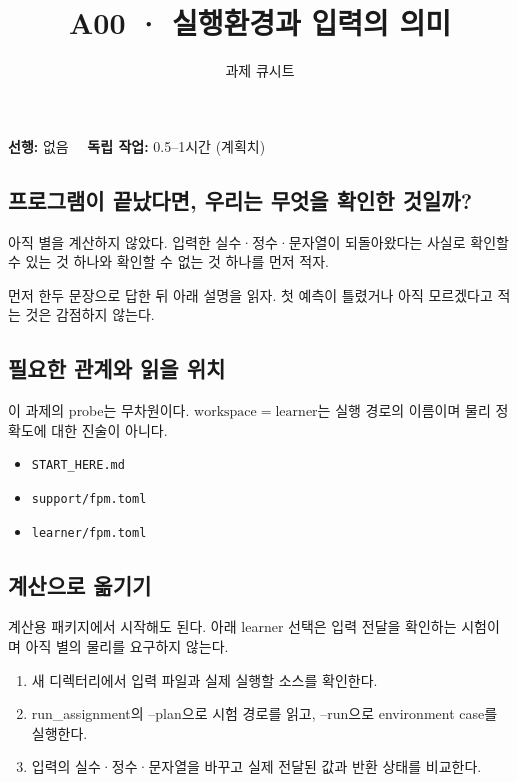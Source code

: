 \documentclass[
  10pt,
  a4paper,
]{article}
\title{A00 · 실행환경과 입력의 의미}
\subtitle{과제 큐시트}
\author{}
\date{}
\providecommand{\tightlist}{%
  \setlength{\itemsep}{0pt}\setlength{\parskip}{0pt}}
\begin{document}
\maketitle

\textbf{선행:} 없음　 \textbf{독립 작업:} 0.5--1시간 (계획치)

\subsection{프로그램이 끝났다면, 우리는 무엇을 확인한
것일까?}\label{uxd504uxb85cuxadf8uxb7a8uxc774-uxb05duxb0acuxb2e4uxba74-uxc6b0uxb9acuxb294-uxbb34uxc5c7uxc744-uxd655uxc778uxd55c-uxac83uxc77cuxae4c}

아직 별을 계산하지 않았다. 입력한 실수·정수·문자열이 되돌아왔다는 사실로
확인할 수 있는 것 하나와 확인할 수 없는 것 하나를 먼저 적자.

먼저 한두 문장으로 답한 뒤 아래 설명을 읽자. 첫 예측이 틀렸거나 아직
모르겠다고 적는 것은 감점하지 않는다.

\subsection{필요한 관계와 읽을
위치}\label{uxd544uxc694uxd55c-uxad00uxacc4uxc640-uxc77duxc744-uxc704uxce58}

이 과제의 probe는 무차원이다. \(\mathrm{workspace}=\mathrm{learner}\)는
실행 경로의 이름이며 물리 정확도에 대한 진술이 아니다.

\begin{itemize}
\tightlist
\item
  \texttt{START\_HERE.md}
\item
  \texttt{support/fpm.toml}
\item
  \texttt{learner/fpm.toml}
\end{itemize}

\subsection{계산으로
옮기기}\label{uxacc4uxc0b0uxc73cuxb85c-uxc62euxae30uxae30}

계산용 패키지에서 시작해도 된다. 아래 learner 선택은 입력 전달을
확인하는 시험이며 아직 별의 물리를 요구하지 않는다.

\begin{enumerate}
\def\labelenumi{\arabic{enumi}.}
\tightlist
\item
  새 디렉터리에서 입력 파일과 실제 실행할 소스를 확인한다.
\item
  run\_assignment의 --plan으로 시험 경로를 읽고, --run으로 environment
  case를 실행한다.
\item
  입력의 실수·정수·문자열을 바꾸고 실제 전달된 값과 반환 상태를
  비교한다.
\end{enumerate}
\end{document}

